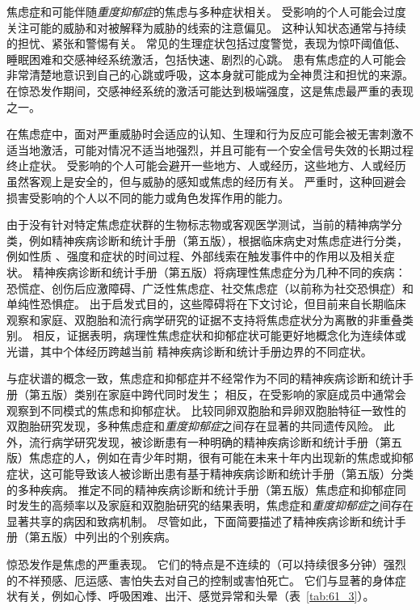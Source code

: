 焦虑症和可能伴随\textit{重度抑郁症}的焦虑与多种症状相关。
受影响的个人可能会过度关注可能的威胁和对被解释为威胁的线索的注意偏见。
这种认知状态通常与持续的担忧、紧张和警惕有关。
常见的生理症状包括过度警觉，表现为惊吓阈值低、睡眠困难和交感神经系统激活，包括快速、剧烈的心跳。
患有焦虑症的人可能会非常清楚地意识到自己的心跳或呼吸，这本身就可能成为全神贯注和担忧的来源。
在惊恐发作期间，交感神经系统的激活可能达到极端强度，这是焦虑最严重的表现之一。


在焦虑症中，面对严重威胁时会适应的认知、生理和行为反应可能会被无害刺激不适当地激活，可能对情况不适当地强烈，并且可能有一个安全信号失效的长期过程 终止症状。
受影响的个人可能会避开一些地方、人或经历，这些地方、人或经历虽然客观上是安全的，但与威胁的感知或焦虑的经历有关。
严重时，这种回避会损害受影响的个人以不同的能力或角色发挥作用的能力。


由于没有针对特定焦虑症状群的生物标志物或客观医学测试，当前的精神病学分类，例如精神疾病诊断和统计手册（第五版），根据临床病史对焦虑症进行分类，例如性质 、强度和症状的时间过程、外部线索在触发事件中的作用以及相关症状。
精神疾病诊断和统计手册（第五版）将病理性焦虑症分为几种不同的疾病：恐慌症、创伤后应激障碍、广泛性焦虑症、社交焦虑症（以前称为社交恐惧症）和单纯性恐惧症。
出于启发式目的，这些障碍将在下文讨论，但目前来自长期临床观察和家庭、双胞胎和流行病学研究的证据不支持将焦虑症状分为离散的非重叠类别。
相反，证据表明，病理性焦虑症状和抑郁症状可能更好地概念化为连续体或光谱，其中个体经历跨越当前 精神疾病诊断和统计手册边界的不同症状。


与症状谱的概念一致，焦虑症和抑郁症并不经常作为不同的精神疾病诊断和统计手册（第五版）类别在家庭中跨代同时发生；
相反，在受影响的家庭成员中通常会观察到不同模式的焦虑和抑郁症状。
比较同卵双胞胎和异卵双胞胎特征一致性的双胞胎研究发现，多种焦虑症和\textit{重度抑郁症}之间存在显著的共同遗传风险。
此外，流行病学研究发现，被诊断患有一种明确的精神疾病诊断和统计手册（第五版）焦虑症的人，例如在青少年时期，很有可能在未来十年内出现新的焦虑或抑郁症状，这可能导致该人被诊断出患有基于精神疾病诊断和统计手册（第五版）分类的多种疾病。
推定不同的精神疾病诊断和统计手册（第五版）焦虑症和抑郁症同时发生的高频率以及家庭和双胞胎研究的结果表明，焦虑症和\textit{重度抑郁症}之间存在显著共享的病因和致病机制。
尽管如此，下面简要描述了精神疾病诊断和统计手册（第五版）中列出的个别疾病。


惊恐发作是焦虑的严重表现。
它们的特点是不连续的（可以持续很多分钟）强烈的不祥预感、厄运感、害怕失去对自己的控制或害怕死亡。
它们与显著的身体症状有关，例如心悸、呼吸困难、出汗、感觉异常和头晕（表~\ref{tab:61_3}）。


